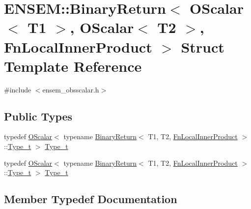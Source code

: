 \hypertarget{structENSEM_1_1BinaryReturn_3_01OScalar_3_01T1_01_4_00_01OScalar_3_01T2_01_4_00_01FnLocalInnerProduct_01_4}{}\section{E\+N\+S\+EM\+:\+:Binary\+Return$<$ O\+Scalar$<$ T1 $>$, O\+Scalar$<$ T2 $>$, Fn\+Local\+Inner\+Product $>$ Struct Template Reference}
\label{structENSEM_1_1BinaryReturn_3_01OScalar_3_01T1_01_4_00_01OScalar_3_01T2_01_4_00_01FnLocalInnerProduct_01_4}


{\ttfamily \#include $<$ensem\+\_\+obsscalar.\+h$>$}

\subsection*{Public Types}
\begin{DoxyCompactItemize}
\item 
typedef \mbox{\hyperlink{classENSEM_1_1OScalar}{O\+Scalar}}$<$ typename \mbox{\hyperlink{structENSEM_1_1BinaryReturn}{Binary\+Return}}$<$ T1, T2, \mbox{\hyperlink{structENSEM_1_1FnLocalInnerProduct}{Fn\+Local\+Inner\+Product}} $>$\+::\mbox{\hyperlink{structENSEM_1_1BinaryReturn_3_01OScalar_3_01T1_01_4_00_01OScalar_3_01T2_01_4_00_01FnLocalInnerProduct_01_4_a96c2eb7ff0bb862f8f194a8170dac35a}{Type\+\_\+t}} $>$ \mbox{\hyperlink{structENSEM_1_1BinaryReturn_3_01OScalar_3_01T1_01_4_00_01OScalar_3_01T2_01_4_00_01FnLocalInnerProduct_01_4_a96c2eb7ff0bb862f8f194a8170dac35a}{Type\+\_\+t}}
\item 
typedef \mbox{\hyperlink{classENSEM_1_1OScalar}{O\+Scalar}}$<$ typename \mbox{\hyperlink{structENSEM_1_1BinaryReturn}{Binary\+Return}}$<$ T1, T2, \mbox{\hyperlink{structENSEM_1_1FnLocalInnerProduct}{Fn\+Local\+Inner\+Product}} $>$\+::\mbox{\hyperlink{structENSEM_1_1BinaryReturn_3_01OScalar_3_01T1_01_4_00_01OScalar_3_01T2_01_4_00_01FnLocalInnerProduct_01_4_a96c2eb7ff0bb862f8f194a8170dac35a}{Type\+\_\+t}} $>$ \mbox{\hyperlink{structENSEM_1_1BinaryReturn_3_01OScalar_3_01T1_01_4_00_01OScalar_3_01T2_01_4_00_01FnLocalInnerProduct_01_4_a96c2eb7ff0bb862f8f194a8170dac35a}{Type\+\_\+t}}
\end{DoxyCompactItemize}


\subsection{Member Typedef Documentation}
\mbox{\label{structENSEM_1_1BinaryReturn_3_01OScalar_3_01T1_01_4_00_01OScalar_3_01T2_01_4_00_01FnLocalInnerProduct_01_4_a96c2eb7ff0bb862f8f194a8170dac35a}} 
